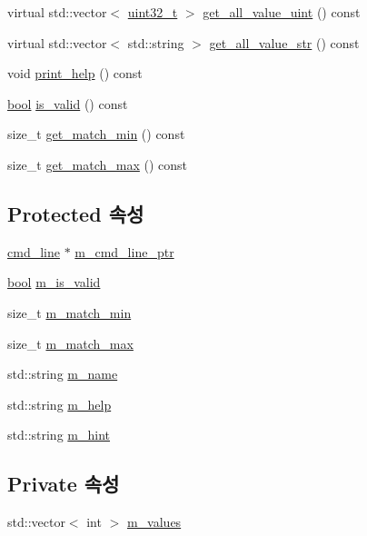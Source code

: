 \begin{DoxyCompactItemize}
virtual std\+::vector$<$ \hyperlink{parse_8c_a6eb1e68cc391dd753bc8ce896dbb8315}{uint32\+\_\+t} $>$ \hyperlink{classcli__argument_a2636ddb80a5e6d770a9928181926cfe2}{get\+\_\+all\+\_\+value\+\_\+uint} () const 
\item 
virtual std\+::vector$<$ std\+::string $>$ \hyperlink{classcli__argument_a3db4f59a61184261b69eb347d37ee066}{get\+\_\+all\+\_\+value\+\_\+str} () const 
\item 
void \hyperlink{classcli__argument_a695407d45700941d937b4c11c6b140d1}{print\+\_\+help} () const 
\item 
\hyperlink{avb__gptp_8h_af6a258d8f3ee5206d682d799316314b1}{bool} \hyperlink{classcli__argument_a73e929d29381f1d792af13350b79222c}{is\+\_\+valid} () const 
\item 
size\+\_\+t \hyperlink{classcli__argument_a513ea3e90c4e9f5f32dbb57b4e989280}{get\+\_\+match\+\_\+min} () const 
\item 
size\+\_\+t \hyperlink{classcli__argument_abc7abd92891ff2380bbaf15b99eb6394}{get\+\_\+match\+\_\+max} () const 
\end{DoxyCompactItemize}
\subsection*{Protected 속성}
\begin{DoxyCompactItemize}
\item 
\hyperlink{classcmd__line}{cmd\+\_\+line} $\ast$ \hyperlink{classcli__argument_a802ef904236d4228f1b8edb3a96eb9cd}{m\+\_\+cmd\+\_\+line\+\_\+ptr}
\item 
\hyperlink{avb__gptp_8h_af6a258d8f3ee5206d682d799316314b1}{bool} \hyperlink{classcli__argument_a3163252d457c8ef3a286a8538d7e319f}{m\+\_\+is\+\_\+valid}
\item 
size\+\_\+t \hyperlink{classcli__argument_a9e9208481670105577821d0a1aee5179}{m\+\_\+match\+\_\+min}
\item 
size\+\_\+t \hyperlink{classcli__argument_a6f9fd009acee86b73a9f1b8e80a95b43}{m\+\_\+match\+\_\+max}
\item 
std\+::string \hyperlink{classcli__argument_adb41893ba19e889e56c559f25fc1a68a}{m\+\_\+name}
\item 
std\+::string \hyperlink{classcli__argument_a3985971d45415a337f60ed183b445c96}{m\+\_\+help}
\item 
std\+::string \hyperlink{classcli__argument_a3feeeba99be6bb94b8fa0ebc88ef09cf}{m\+\_\+hint}
\end{DoxyCompactItemize}
\subsection*{Private 속성}
\begin{DoxyCompactItemize}
\item 
std\+::vector$<$ int $>$ \hyperlink{classcli__argument__int_a36798cf959b4fd3cf2135baea640ab78}{m\+\_\+values}
\end{DoxyCompactItemize}


